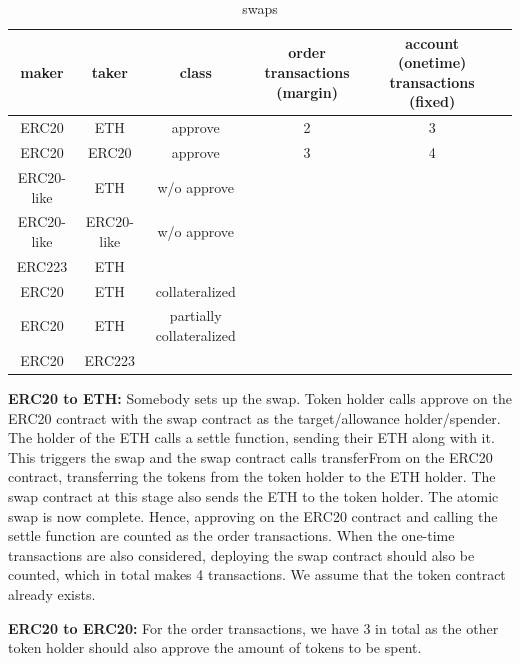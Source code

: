 \begin{table}[h!]
\footnotesize
\centering
\begin{tabular}{ |c|c|c|c|c|c| }
  \hline
   maker & taker & class & order transactions (margin) & account (onetime) transactions (fixed) \\ \hline
   ERC20 & ETH & approve & 2 & 3 \\ \hline
   ERC20 & ERC20 & approve & 3 & 4 \\ \hline
   ERC20-like & ETH & w/o approve &  & \\ \hline
   ERC20-like & ERC20-like & w/o approve &  & \\ \hline
   ERC223 & ETH & & &\\ \hline
   ERC20 & ETH & collateralized & &\\ \hline
   ERC20 & ETH & partially collateralized & &\\ \hline
   ERC20 & ERC223 & & \\ \hline
\end{tabular}
\caption {swaps}
\end{table}\label{Table:Comparison of different swaps}
\textbf{ERC20 to ETH:} Somebody sets up the swap. Token holder calls approve on the ERC20 contract with the swap contract as the target/allowance holder/spender. The holder of the ETH calls a settle function, sending their ETH along with it. This triggers the swap and the swap contract calls transferFrom on the ERC20 contract, transferring the tokens from the token holder to the ETH holder. The swap contract at this stage also sends the ETH to the token holder. The atomic swap is now complete. Hence, approving on the ERC20 contract and calling the settle function are counted as the order transactions. When the one-time transactions are also considered, deploying the swap contract should also be counted, which in total makes 4 transactions. We assume that the token contract already exists.

\textbf{ERC20 to ERC20:} For the order transactions, we have 3 in total as the other token holder should also approve the amount of tokens to be spent. 